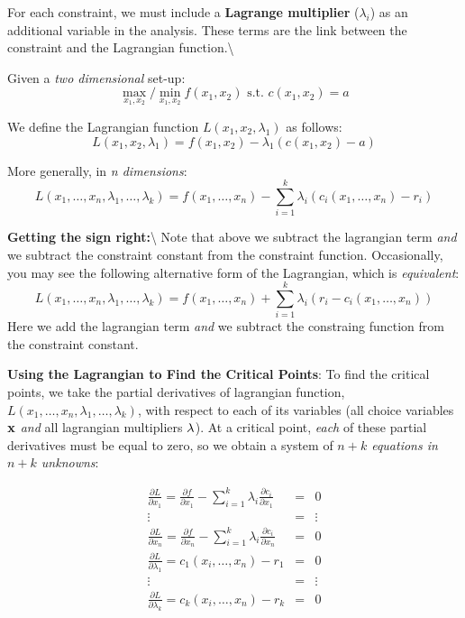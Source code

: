 \documentclass[]{book}
\theoremstyle{definition}
\theoremstyle{definition}
\theoremstyle{definition}
\theoremstyle{remark}
\begin{document}
For each constraint, we must include a \textbf{Lagrange multiplier}
(\(\lambda_i\)) as an additional variable in the analysis. These terms
are the link between the constraint and the Lagrangian
function.\textbackslash{}

Given a \textit{two dimensional} set-up:
\[\max_{x_1,x_2}/\min_{x_1,x_2} f(x_1,x_2) \text{ s.t. } c(x_1,x_2) = a\]

We define the Lagrangian function \(L(x_1,x_2,\lambda_1)\) as follows:
\[L(x_1,x_2,\lambda_1) = f(x_1,x_2) - \lambda_1 (c(x_1,x_2) - a)\]

More generally, in \textit{n dimensions}:
\[ L(x_1, \dots, x_n, \lambda_1, \dots, \lambda_k) = f(x_1, \dots, x_n) - \sum_{i=1}^k\lambda_i(c_i(x_1,\dots, x_n) - r_i)\]

\textbf{Getting the sign right:}\textbackslash{} Note that above we
subtract the lagrangian term \textit{and} we subtract the constraint
constant from the constraint function. Occasionally, you may see the
following alternative form of the Lagrangian, which is
\textit{equivalent}:
\[ L(x_1, \dots, x_n, \lambda_1, \dots, \lambda_k) = f(x_1, \dots, x_n) + \sum_{i=1}^k\lambda_i(r_i - c_i(x_1,\dots, x_n))\]
Here we add the lagrangian term \textit{and} we subtract the constraing
function from the constraint constant.

\textbf{Using the Lagrangian to Find the Critical Points}: To find the
critical points, we take the partial derivatives of lagrangian function,
\(L(x_1, \dots, x_n, \lambda_1, \dots, \lambda_k)\), with respect to
each of its variables (all choice variables \({\bf x}\) \textit{and} all
lagrangian multipliers \({\bf \lambda}\)). At a critical point,
\textit{each} of these partial derivatives must be equal to zero, so we
obtain a system of \textit{$n + k$ equations in $n + k$ unknowns}:

\begin{eqnarray*}
\frac{\partial L}{\partial x_1} = \frac{\partial f}{\partial x_1} - \sum_{i = 1}^k\lambda_i\frac{\partial c_i}{\partial x_1} & = & 0\\
 \vdots & = & \vdots \nonumber \\ 
\frac{\partial L}{\partial x_n}  = \frac{\partial f}{\partial x_n} - \sum_{i = 1}^k\lambda_i\frac{\partial c_i}{\partial x_n} & =  & 0\\
\frac{\partial L}{\partial \lambda_1} = c_1(x_i, \dots, x_n) - r_1& = & 0\\
 \vdots & = & \vdots \nonumber \\
\frac{\partial L}{\partial \lambda_k} = c_k(x_i, \dots, x_n) - r_k & = & 0
\end{eqnarray*}
\end{document}
